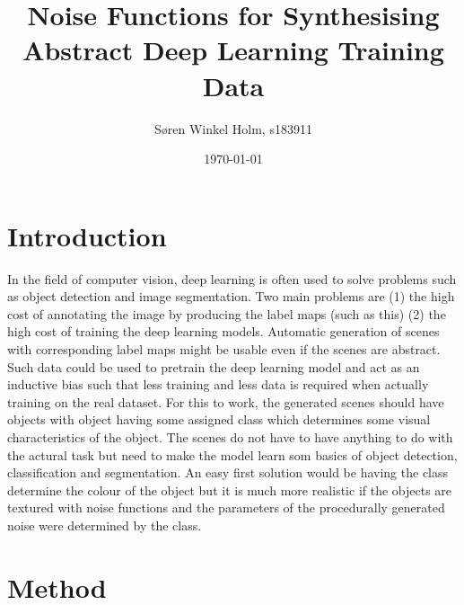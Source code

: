 \documentclass[12pt,fleqn]{article}
\title{Noise Functions for Synthesising Abstract Deep Learning Training Data}
\author{Søren Winkel Holm, s183911}
\date{\today}
\begin{document}
\maketitle
\thispagestyle{fancy}
\tableofcontents
\newpage


\section{Introduction}%
\label{sec:intro}
In the field of computer vision, deep learning is often used to solve problems such as object detection and image segmentation. Two main problems are (1) the high cost of annotating the image by producing the label maps (such as this) (2) the high cost of training the deep learning models. Automatic generation of scenes with corresponding label maps might be usable even if the scenes are abstract. Such data could be used to pretrain the deep learning model and act as an inductive bias such that less training and less data is required when actually training on the real dataset. For this to work, the generated scenes should have objects with object having some assigned class which determines some visual characteristics of the object. The scenes do not have to have anything to do with the actural task but need to make the model learn som basics of object detection, classification and segmentation. An easy first solution would be having the class determine the colour of the object but it is much more realistic if the objects are textured with noise functions and the parameters of the procedurally generated noise were determined by the class.

\section{Method}%
\label{sec:method}
\end{document}
